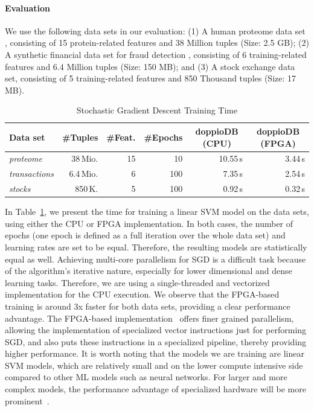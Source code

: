 \documentclass[11pt,dvipdfm]{article}
\newcommand{\centercell}[1]{\multicolumn{1}{c|}{#1}}
\newcommand{\head}[1]{\centercell{\textbf{#1}}}
\newcommand{\headlast}[1]{\multicolumn{1}{c}{\textbf{#1}}}
\begin{document}
\paragraph{\textbf{Evaluation}}
We use the following data sets in our evaluation:
(1) A human proteome data set \cite{wilhelm2014mass}, consisting of 15 protein-related features and 38 Million tuples (Size: 2.5 GB); (2) A synthetic financial data set for fraud detection \cite{lopez2016paysim}, consisting of 6 training-related features and 6.4 Million tuples (Size: 150 MB); and (3) A stock exchange data set, consisting of 5 training-related features and 850 Thousand tuples (Size: 17 MB).

\begin{table}[t]
\vspace{-.5em}
	\centering
	\caption{Stochastic Gradient Descent Training Time}
\vspace{-.5em}
	\def\arraystretch{1.2}
	\begin{tabular}{l|r|r|r|r|r}
		\textbf{Data set} & \head{\#Tuples} & \head{\#Feat.} & \head{\#Epochs} & \head{doppioDB (CPU)} & \headlast{doppioDB (FPGA)} \\
		\hline
		\emph{proteome}     & 38\,Mio.   & 15 & 10  & 10.55\,s & 3.44\,s \\
		\emph{transactions} & 6.4\,Mio.  & 6  & 100 & 7.35\,s  & 2.54\,s \\
		\emph{stocks}       & 850\,K.    & 5  & 100 & 0.92\,s  & 0.32\,s \\
	\end{tabular} 
	\label{tab:sgd-result}
\end{table}

In Table~\ref{tab:sgd-result}, we present the time for training a linear SVM model on the data sets, using either the CPU or FPGA implementation. In both cases, the number of epochs (one epoch is defined as a full iteration over the whole data set) and learning rates are set to be equal. Therefore, the resulting models are statistically equal as well. Achieving multi-core parallelism for SGD is a difficult task because of the algorithm's iterative nature, especially for lower dimensional and dense learning tasks. Therefore, we are using a single-threaded and vectorized implementation for the CPU execution. We observe that the FPGA-based training is around 3x faster for both data sets, providing a clear performance advantage. The FPGA-based implementation~\cite{kara2017fpga2} offers finer grained parallelism, allowing the implementation of specialized vector instructions just for performing SGD, and also puts these instructions in a specialized pipeline, thereby providing higher performance. It is worth noting that the models we are training are linear SVM models, which are relatively small and on the lower compute intensive side compared to other ML models such as neural networks. For larger and more complex models, the performance advantage of specialized hardware will be more prominent~\cite{umuroglu2017finn, nurvitadhi2017can}. 
\end{document}
